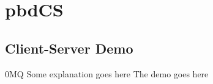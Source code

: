 \section{pbdCS}
\makesubcontentsslides

\subsection{Client-Server Demo}
\makesubcontentsslidessec

\begin{frame}{0MQ}
Some explanation goes here
The demo goes here
\end{frame}